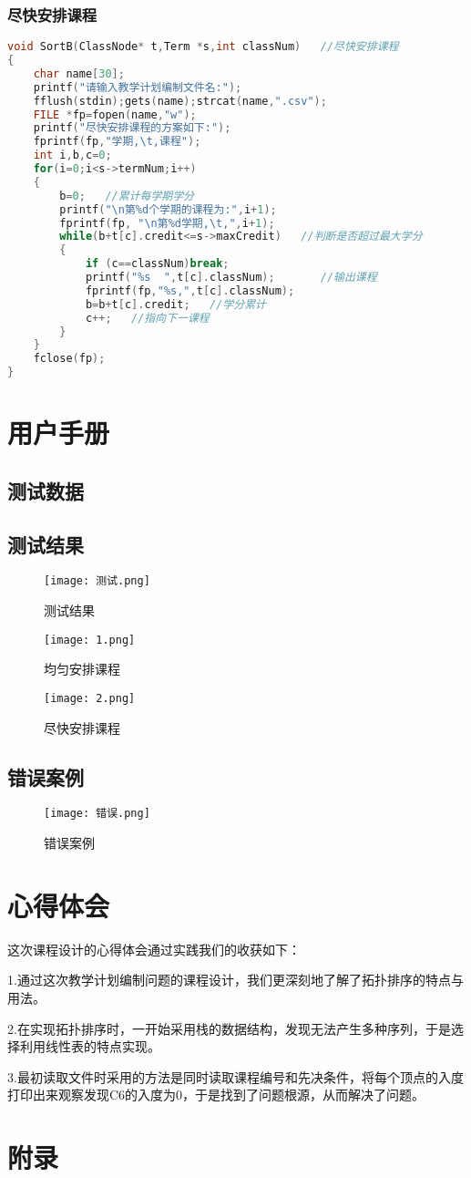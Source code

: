 \documentclass{DateStructure}
\begin{document}
\subsubsection{尽快安排课程}
\begin{lstlisting}[language=c,caption={SortB}]
void SortB(ClassNode* t,Term *s,int classNum)   //尽快安排课程
{
	char name[30];
	printf("请输入教学计划编制文件名:");
	fflush(stdin);gets(name);strcat(name,".csv");
	FILE *fp=fopen(name,"w");
	printf("尽快安排课程的方案如下:");
	fprintf(fp,"学期,\t,课程");
	int i,b,c=0;		
	for(i=0;i<s->termNum;i++)
	{
		b=0;   //累计每学期学分
		printf("\n第%d个学期的课程为:",i+1);
		fprintf(fp, "\n第%d学期,\t,",i+1);
		while(b+t[c].credit<=s->maxCredit)   //判断是否超过最大学分
		{
			if (c==classNum)break;
			printf("%s  ",t[c].classNum);		//输出课程
			fprintf(fp,"%s,",t[c].classNum);
			b=b+t[c].credit;   //学分累计
			c++;   //指向下一课程
		}
	}
	fclose(fp);
}
\end{lstlisting}

\section{用户手册}
\subsection{测试数据}

\subsection{测试结果}
\begin{figure}[H] 
\centering
\texttt{[image: 测试.png]}
\caption{测试结果}
\end{figure}
\begin{figure}[H] 
\centering
\texttt{[image: 1.png]}
\caption{均匀安排课程}
\end{figure}
\begin{figure}[H] 
\centering
\texttt{[image: 2.png]}
\caption{尽快安排课程}
\end{figure}
\subsection{错误案例}

\begin{figure}[H] 
\centering
\texttt{[image: 错误.png]}
\caption{错误案例}
\end{figure}

\section{心得体会}
这次课程设计的心得体会通过实践我们的收获如下：\par
1.通过这次教学计划编制问题的课程设计，我们更深刻地了解了拓扑排序的特点与用法。\par
2.在实现拓扑排序时，一开始采用栈的数据结构，发现无法产生多种序列，于是选择利用线性表的特点实现。\par
3.最初读取文件时采用的方法是同时读取课程编号和先决条件，将每个顶点的入度打印出来观察发现C6的入度为0，于是找到了问题根源，从而解决了问题。

\newpage 
\section{附录}

\end{document}
